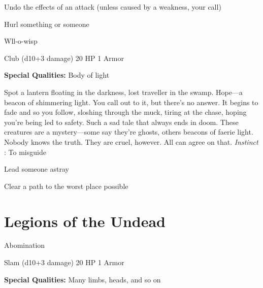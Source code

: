 \startitemize[1,packed]
         
\item Undo the effects of an attack (unless caused by a weakness, your call)

         
\item Hurl something or someone

       
\stopitemize
       
\startMonsterName
Wll-o-wisp	 
\stopMonsterName
       

Club (d10+3 damage)	20 HP	1 Armor

       


       
\startMonsterQualities
         {\bf Special Qualities:}  Body of light
\stopMonsterQualities
       
\startMonsterDescription
Spot a lantern floating in the darkness, lost traveller in the swamp. Hope—a beacon of shimmering light. You call out to it, but there’s no answer. It begins to fade and so you follow, sloshing through the muck, tiring at the chase, hoping you’re being led to safety. Such a sad tale that always ends in doom. These creatures are a mystery—some say they’re ghosts, others beacons of faerie light. Nobody knows the truth. They are cruel, however. All can agree on that. {\em Instinct} : To misguide
\stopMonsterDescription
       
\startitemize[1,packed]
         
\item Lead someone astray

         
\item Clear a path to the worst place possible

       
\stopitemize
                
\section{Legions of the Undead}    
            
\startMonsterName
Abomination	 
\stopMonsterName
       

Slam (d10+3 damage)	20 HP	1 Armor

       


       
\startMonsterQualities
         {\bf Special Qualities:}  Many limbs, heads, and so on
\stopMonsterQualities
       
